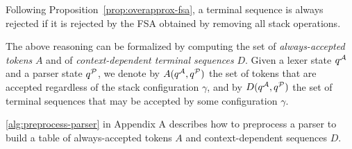 Following Proposition~\ref{prop:overapprox-fsa}, a terminal sequence is always rejected if it is rejected by the FSA obtained by removing all stack operations.
% 


The above reasoning can be formalized by computing the set of \textit{always-accepted tokens} $A$ and of \textit{context-dependent terminal sequences} $D$.
%
Given a lexer state $q^{\mathcal{A}}$ and a parser state $q^{\mathcal{P}}$, we denote by $A(q^{\mathcal{A}}, q^{\mathcal{P}})$ the set of tokens that are accepted regardless of the stack configuration $\gamma$, and by $D(q^{\mathcal{A}}, q^{\mathcal{P}})$ the set of terminal sequences that may be accepted by some configuration $\gamma$. 

\autoref{alg:preprocess-parser} in Appendix A describes how to preprocess a parser to build a table of always-accepted tokens $A$ and context-dependent sequences $D$.

\setcounter{algorithm}{5}


